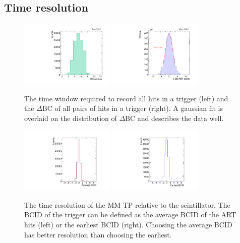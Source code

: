 \subsection{Time resolution}

\begin{figure}[!htpb]
  \begin{center}
    \includegraphics[width=0.4\textwidth]{figures/gbtanalysis3522/artwin_lin.pdf}
    \includegraphics[width=0.4\textwidth]{figures/gbtanalysis3522/artrpairs_lin.pdf}
  \end{center}
  \vspace{-10pt}
  \caption{The time window required to record all hits in a trigger (left) and the $\Delta\text{BC}$ of all pairs of hits in a trigger (right). A gaussian fit is overlaid on the distribution of $\Delta\text{BC}$ and describes the data well.}
  \label{fig:time}
\end{figure}

\begin{figure}[!htpb]
  \begin{center}
    \includegraphics[width=0.4\textwidth]{figures/gbtanalysis3522/avg_BCID.pdf}
    \includegraphics[width=0.4\textwidth]{figures/gbtanalysis3522/earliest_BCID.pdf}
  \end{center}
  \vspace{-10pt}
  \caption{The time resolution of the MM TP relative to the scintillator. The BCID of the trigger can be defined as the average BCID of the ART hits (left) or the earliest BCID (right). Choosing the average BCID has better resolution than choosing the earliest.}
  \label{fig:timeres}
\end{figure}

